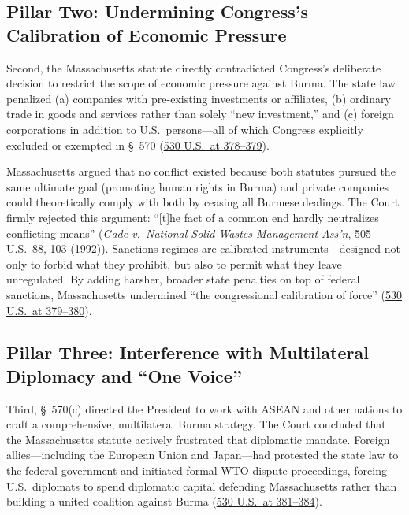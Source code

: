 \documentclass[12pt]{article}
\begin{document}
\subsection{Pillar Two: Undermining Congress's Calibration of Economic Pressure}
Second, the Massachusetts statute directly contradicted Congress's deliberate decision to restrict the scope of economic pressure against Burma. The state law penalized (a) companies with pre-existing investments or affiliates, (b) ordinary trade in goods and services rather than solely ``new investment,'' and (c) foreign corporations in addition to U.S.\ persons---all of which Congress explicitly excluded or exempted in \S~570 (\href{https://supreme.justia.com/cases/federal/us/530/363/}{530 U.S.\ at 378--379}).

Massachusetts argued that no conflict existed because both statutes pursued the same ultimate goal (promoting human rights in Burma) and private companies could theoretically comply with both by ceasing all Burmese dealings. The Court firmly rejected this argument: ``[t]he fact of a common end hardly neutralizes conflicting means'' (\textit{Gade v.\ National Solid Wastes Management Ass'n}, 505 U.S.\ 88, 103 (1992)). Sanctions regimes are calibrated instruments---designed not only to forbid what they prohibit, but also to permit what they leave unregulated. By adding harsher, broader state penalties on top of federal sanctions, Massachusetts undermined ``the congressional calibration of force'' (\href{https://supreme.justia.com/cases/federal/us/530/363/}{530 U.S.\ at 379--380}).

\subsection{Pillar Three: Interference with Multilateral Diplomacy and ``One Voice''}
Third, \S~570(c) directed the President to work with ASEAN and other nations to craft a comprehensive, multilateral Burma strategy. The Court concluded that the Massachusetts statute actively frustrated that diplomatic mandate. Foreign allies---including the European Union and Japan---had protested the state law to the federal government and initiated formal WTO dispute proceedings, forcing U.S.\ diplomats to spend diplomatic capital defending Massachusetts rather than building a united coalition against Burma (\href{https://www.law.cornell.edu/supct/html/99-474.ZS.html}{530 U.S.\ at 381--384}).
\end{document}
